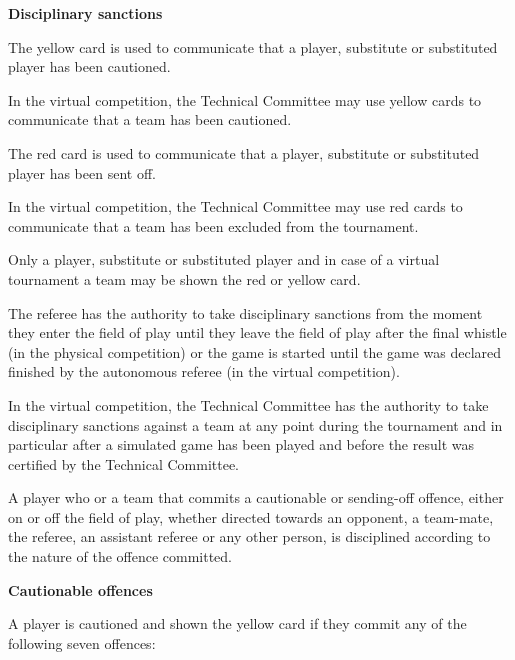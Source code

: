 \bigskip

{\bfseries Disciplinary sanctions}

\headlinebox

The yellow card is used to communicate that a player, substitute or substituted player has been cautioned.

In the virtual competition, the Technical Committee may use yellow cards to communicate that a team has been cautioned.

\bigskip

The red card is used to communicate that a player, substitute or substituted player has been sent off.

In the virtual competition, the Technical Committee may use red cards to communicate that a team has been excluded from the tournament.

\bigskip

Only a player, substitute or substituted player and in case of a virtual tournament a team may be shown the red or yellow card.

\bigskip

The referee has the authority to take disciplinary sanctions from the moment they enter the field of play until they leave the field of play after the final whistle (in the physical competition)
or the game is started until the game was declared finished by the autonomous referee (in the virtual competition).

In the virtual competition, the Technical Committee has the authority to take disciplinary sanctions against a team at any point during the tournament and in particular after a simulated game has been played and before the result was certified by the Technical Committee.

\bigskip

A player who or a team that commits a cautionable or sending-off offence, either on or off the field of play, whether directed towards an opponent, a team-mate, the referee, an assistant referee or any other person, is disciplined according to the nature of the offence committed.

\bigskip

{\bfseries Cautionable offences }

\headlinebox

A player is cautioned and shown the yellow card if they commit any of the following seven offences:


